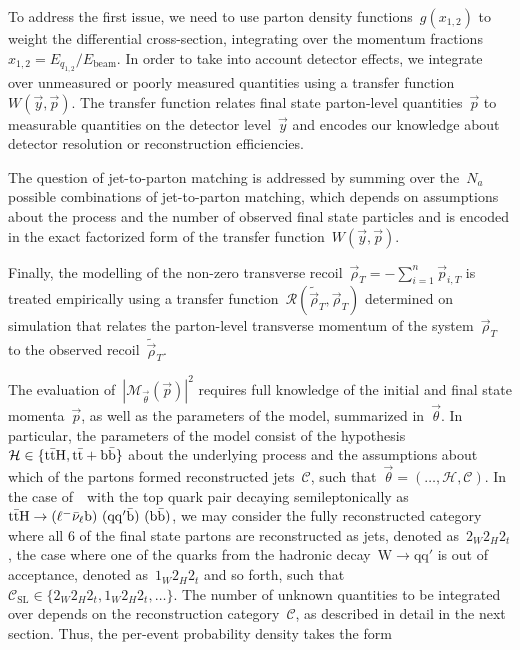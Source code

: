 To address the first issue, we need to use parton density functions~$g(x_{1,2})$ to weight the differential cross-section, integrating over the momentum fractions~$x_{1,2} = E_{q_{1,2}}/E_{\mathrm{beam}}$.
In order to take into account detector effects, we integrate over unmeasured or poorly measured quantities using a transfer function~$W(\vec{y}, \vec{p})$.
The transfer function relates final state parton-level quantities~$\vec{p}$ to measurable quantities on the detector level~$\vec{y}$ and encodes our knowledge about detector resolution or reconstruction efficiencies.

The question of jet-to-parton matching is addressed by summing over the~$N_a$ possible combinations of jet-to-parton matching, which depends on assumptions about the process and the number of observed final state particles and is encoded in the exact factorized form of the transfer function~$W(\vec{y}, \vec{p})$.

Finally, the modelling of the non-zero transverse recoil~$\vec{\rho}_T = -\sum_{i=1}^n \vec{p}_{i,T}$ is treated empirically using a transfer function~$\mathcal{R}(\tilde{\vec{\rho}}_T, \vec{\rho}_T)$ determined on simulation that relates the parton-level transverse momentum of the system~$\vec{\rho}_T$ to the observed recoil~$\tilde{\vec{\rho}}_T$. 

The evaluation of~$|\mathcal{M}_{\vec{\theta}}(\vec{p})|^2$ requires full knowledge of the initial and final state momenta~$\vec{p}$, as well as the parameters of the model, summarized in~$\vec{\theta}$. In particular, the parameters of the model consist of the hypothesis~$\mathcal{H} \in \{\mathrm{t} \bar{\mathrm{t}} \mathrm{H}, \mathrm{t} \bar{\mathrm{t}} + \mathrm{b}\bar{\mathrm{b}}\}$ about the underlying process and the assumptions about which of the partons formed reconstructed jets~$\mathcal{C}$, such that~$\vec{\theta} = (\dots, \mathcal{H}, \mathcal{C})$. In the case of~\ttH~with the top quark pair decaying semileptonically as~$\mathrm{t} \bar{\mathrm{t}} \mathrm{H} \rightarrow (\ell^- \bar{\mathrm{\nu}}_\ell \mathrm{b})\ (\mathrm{q} \mathrm{q}' \bar{\mathrm{b}})\ (\mathrm{b} \bar{\mathrm{b}})$, we may consider the fully reconstructed category where all 6 of the final state partons are reconstructed as jets, denoted as~$2_W 2_H 2_t$, the case where one of the quarks from the hadronic decay~$\mathrm{W} \rightarrow \mathrm{q} \mathrm{q}'$ is out of acceptance, denoted as~$1_W 2_H 2_t$ and so forth, such that~$\mathcal{C}_{\mathrm{SL}} \in \{ 2_W 2_H 2_t, 1_W 2_H 2_t, \dots \}$. The number of unknown quantities to be integrated over depends on the reconstruction category~$\mathcal{C}$, as described in detail in the next section. 
Thus, the per-event probability density takes the form

